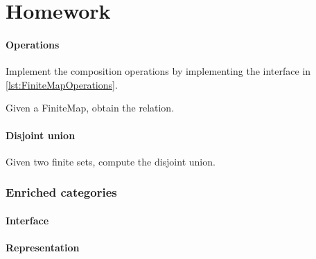 \part{Homework}



\subsection{Operations}


\begin{codeexercise}[Composition]
  Implement the composition operations by implementing the interface in \cref{lst:FiniteMapOperations}.
\end{codeexercise}



\begin{codeexercise}
  Given a FiniteMap, obtain the relation.


\end{codeexercise}
\subsection{Disjoint union}
\begin{codeexercise}
  Given two finite sets, compute the disjoint union.

\end{codeexercise}














\section{Enriched categories}

\subsection*{Interface}


\subsection*{Representation}



